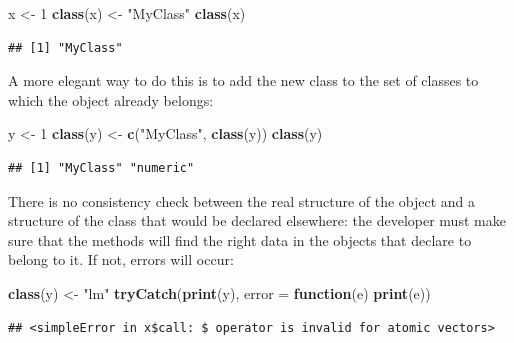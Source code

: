 \documentclass[
  12pt,
  american,
  a4paper,
  extrafontsizes,onecolumn,openright
  ]{memoir}
\newenvironment{Shaded}{\begin{snugshade}}{\end{snugshade}}
\newcommand{\AttributeTok}[1]{\textcolor[rgb]{0.13,0.29,0.53}{#1}}
\newcommand{\ControlFlowTok}[1]{\textcolor[rgb]{0.13,0.29,0.53}{\textbf{#1}}}
\newcommand{\DecValTok}[1]{\textcolor[rgb]{0.00,0.00,0.81}{#1}}
\newcommand{\FunctionTok}[1]{\textcolor[rgb]{0.13,0.29,0.53}{\textbf{#1}}}
\newcommand{\NormalTok}[1]{#1}
\newcommand{\OtherTok}[1]{\textcolor[rgb]{0.56,0.35,0.01}{#1}}
\newcommand{\StringTok}[1]{\textcolor[rgb]{0.31,0.60,0.02}{#1}}
\begin{document}
\scriptsize

\begin{Shaded}
\begin{Highlighting}[]
\NormalTok{x }\OtherTok{\textless{}{-}} \DecValTok{1}
\FunctionTok{class}\NormalTok{(x) }\OtherTok{\textless{}{-}} \StringTok{"MyClass"}
\FunctionTok{class}\NormalTok{(x)}
\end{Highlighting}
\end{Shaded}

\begin{verbatim}
## [1] "MyClass"
\end{verbatim}

\normalsize

A more elegant way to do this is to add the new class to the set of classes to which the object already belongs:

\scriptsize

\begin{Shaded}
\begin{Highlighting}[]
\NormalTok{y }\OtherTok{\textless{}{-}} \DecValTok{1}
\FunctionTok{class}\NormalTok{(y) }\OtherTok{\textless{}{-}} \FunctionTok{c}\NormalTok{(}\StringTok{"MyClass"}\NormalTok{, }\FunctionTok{class}\NormalTok{(y))}
\FunctionTok{class}\NormalTok{(y)}
\end{Highlighting}
\end{Shaded}

\begin{verbatim}
## [1] "MyClass" "numeric"
\end{verbatim}

\normalsize

There is no consistency check between the real structure of the object and a structure of the class that would be declared elsewhere: the developer must make sure that the methods will find the right data in the objects that declare to belong to it.
If not, errors will occur:

\scriptsize

\begin{Shaded}
\begin{Highlighting}[]
\FunctionTok{class}\NormalTok{(y) }\OtherTok{\textless{}{-}} \StringTok{"lm"}
\FunctionTok{tryCatch}\NormalTok{(}\FunctionTok{print}\NormalTok{(y), }\AttributeTok{error =} \ControlFlowTok{function}\NormalTok{(e) }\FunctionTok{print}\NormalTok{(e))}
\end{Highlighting}
\end{Shaded}

\begin{verbatim}
## <simpleError in x$call: $ operator is invalid for atomic vectors>
\end{verbatim}
\end{document}
